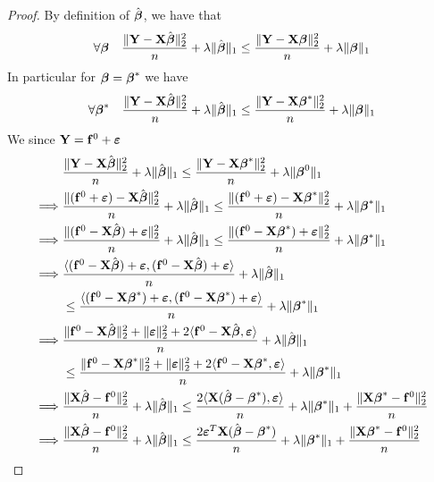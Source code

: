 \begin{proof}
    By definition of $\hat {\boldsymbol{\beta}}$, we have that
    $$
        \forall \boldsymbol{\beta} \quad \frac{\| \mathbf{Y} -\mathbf{X} \hat {\boldsymbol{\beta}} \|_{2}^{2}}{n} + \lambda \| \hat {\boldsymbol{\beta}} \|_{1} \leq \frac{\|\mathbf{Y}-\mathbf{X} \boldsymbol{\beta} \|_{2}^{2}}{n}+\lambda \| \boldsymbol{\beta} \|_{1}
    $$
    In particular for $\boldsymbol{\beta} = \boldsymbol{\beta}^*$ we have
    $$
        \forall \boldsymbol{\beta}^* \quad \frac{\| \mathbf{Y} -\mathbf{X} \hat {\boldsymbol{\beta}} \|_{2}^{2}}{n} + \lambda \| \hat {\boldsymbol{\beta}} \|_{1} \leq \frac{\|\mathbf{Y}-\mathbf{X} \boldsymbol{\beta}^* \|_{2}^{2}}{n}+\lambda \| \boldsymbol{\beta} \|_{1}
    $$
    We since $\mathbf{Y} = \mathbf{f}^0 + \boldsymbol{\varepsilon}$
    \begin{align*}
                 & \frac{\|\mathbf{Y}  - \mathbf{X} \hat{\boldsymbol{\beta}} \|_{2}^{2}}{n} + \lambda \| \hat{\boldsymbol{\beta}}\|_{1} \leq \frac{\| \mathbf{Y}  - \mathbf{X} \boldsymbol{\beta}^* \|_2^2}{n}+\lambda\|\boldsymbol{\beta}^{0}\|_{1}                                                                    \\
        \implies &
        \frac{\| (\mathbf{f}^0 + \boldsymbol{\varepsilon}) - \mathbf{X} \hat {\boldsymbol{\beta}} \|_{2}^{2}}{n} + \lambda\| \hat {\boldsymbol{\beta}} \|_{1} \leq \frac{ \| (\mathbf{f}^0 + \boldsymbol{\varepsilon})-\mathbf{X} \boldsymbol{\beta}^*\|_{2}^{2}}{n}+\lambda \| \boldsymbol{\beta}^*\|_{1}                                          \\
        \implies &
        \frac{\| (\mathbf{f}^0 - \mathbf{X} \hat {\boldsymbol{\beta}} ) + \boldsymbol{\varepsilon} \|_{2}^{2}}{n} + \lambda\| \hat {\boldsymbol{\beta}} \|_{1} \leq \frac{ \| (\mathbf{f}^0 - \mathbf{X} \boldsymbol{\beta}^*) + \boldsymbol{\varepsilon} \|_{2}^{2}}{n}+\lambda \| \boldsymbol{\beta}^*\|_{1}                                      \\
        \implies &
        \frac{\langle (\mathbf{f}^0 - \mathbf{X} \hat {\boldsymbol{\beta}} ) + \boldsymbol{\varepsilon}, (\mathbf{f}^0 - \mathbf{X} \hat {\boldsymbol{\beta}} ) + \boldsymbol{\varepsilon} \rangle}{n} + \lambda\| \hat {\boldsymbol{\beta}} \|_{1}                                                                                     \\
                 & \leq \frac{ \langle (\mathbf{f}^0 - \mathbf{X} \boldsymbol{\beta}^*) + \boldsymbol{\varepsilon}, (\mathbf{f}^0 - \mathbf{X} \boldsymbol{\beta}^*) + \boldsymbol{\varepsilon} \rangle}{n}+\lambda \| \boldsymbol{\beta}^*\|_{1}                                                                                 \\
        \implies &
        \frac{\|\mathbf{f}^0 - \mathbf{X} \hat {\boldsymbol{\beta}} \|_{2}^{2} + \| \boldsymbol{\varepsilon} \|_{2}^{2} + 2\langle \mathbf{f}^0 - \mathbf{X} \hat {\boldsymbol{\beta}}, \boldsymbol{\varepsilon} \rangle}{n} + \lambda\| \hat {\boldsymbol{\beta}} \|_{1}                                                               \\
                 & \leq \frac{\|\mathbf{f}^0 - \mathbf{X} \boldsymbol{\beta}^* \|_{2}^{2} + \| \boldsymbol{\varepsilon} \|_{2}^{2} + 2\langle \mathbf{f}^0 - \mathbf{X} \boldsymbol{\beta}^*, \boldsymbol{\varepsilon} \rangle}{n}+\lambda \| \boldsymbol{\beta}^*\|_{1}                                                          \\
        \implies &
        \frac{\|\mathbf{X} \hat {\boldsymbol{\beta}} - \mathbf{f}^0 \|_{2}^{2}}{n} + \lambda\| \hat {\boldsymbol{\beta}} \|_{1} \leq \frac{2\langle \mathbf{X} (\hat{\boldsymbol{\beta}} - \boldsymbol{\beta}^*), \boldsymbol{\varepsilon} \rangle}{n} + \lambda \| \boldsymbol{\beta}^*\|_{1} + \frac{\|\mathbf{X} \boldsymbol{\beta}^* - \mathbf{f}^0\|_{2}^{2}}{n} \\
        \implies &
        \frac{\|\mathbf{X} \hat {\boldsymbol{\beta}} - \mathbf{f}^0 \|_{2}^{2}}{n} + \lambda\| \hat {\boldsymbol{\beta}} \|_{1} \leq \frac{2 \boldsymbol{\varepsilon}^T \mathbf{X} (\hat{\boldsymbol{\beta}} - \boldsymbol{\beta}^*)}{n} + \lambda \| \boldsymbol{\beta}^*\|_{1} + \frac{\|\mathbf{X} \boldsymbol{\beta}^* - \mathbf{f}^0\|_{2}^{2}}{n}               \\
    \end{align*}
\end{proof}

